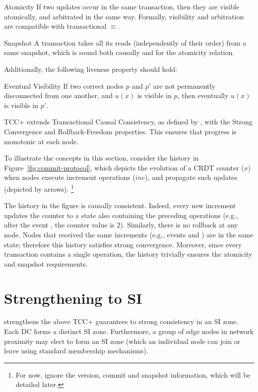 \begin{inv}{Atomicity}
  If two updates occur in the same transaction, then they are visible
  atomically, and arbitrated in the same way.
  Formally, visibility and arbitration are compatible with transactional
  $\equiv$.
\end{inv}

\begin{inv}{Snapshot}
  A transaction takes all its reads (independently of their order) from
  a same snapshot, which is sound both causally and for the atomicity relation.
\end{inv}

Additionally, the following liveness property should hold:

\begin{inv}{Eventual Visibility}
  If two correct nodes $p$ and $p'$ are not permanently disconnected from one another,
  and $u(x)$ is visible in $p$, then eventually $u(x)$ is visible in $p'$.
\end{inv}

TCC+ extends Transactional Causal Consistency, as defined by
\citet{rep:pan:sh177}, with the Strong Convergence and Rollback-Freedom
properties.
This ensures that progress is monotonic at each node.

To illustrate the concepts in this section, consider the history in
Figure~\ref{fig:commit-protocol}, which depicts the evolution of a CRDT
counter ($x$) when nodes execute increment operations ($inc$), and
propagate such updates (depicted by arrows).%
%
\footnote{
  For now, ignore the version, commit and snapshot information, which will
  be detailed later.
}
%

The history in the figure is causally consistent.
Indeed, every new increment updates the counter to a state also
containing the preceding operations (e.g., after the event
, the counter value is $2$).
Similarly, there is no rollback at any node.
Nodes that received the same increments (e.g., events
 and ) are in the same
state; therefore this history satisfies strong convergence.
Moreover, since every transaction contains a single operation, the
history trivially ensures the atomicity and snapshot requirements.

\section{Strengthening to SI}

\system{} strengthens the above TCC+ guarantees to strong consistency in an
SI zone.
Each DC forms a distinct SI zone.
Furthermore, a group of edge nodes in network proximity may elect to
form an SI zone (which an individual node can join or leave using
standard membership mechanisms).

